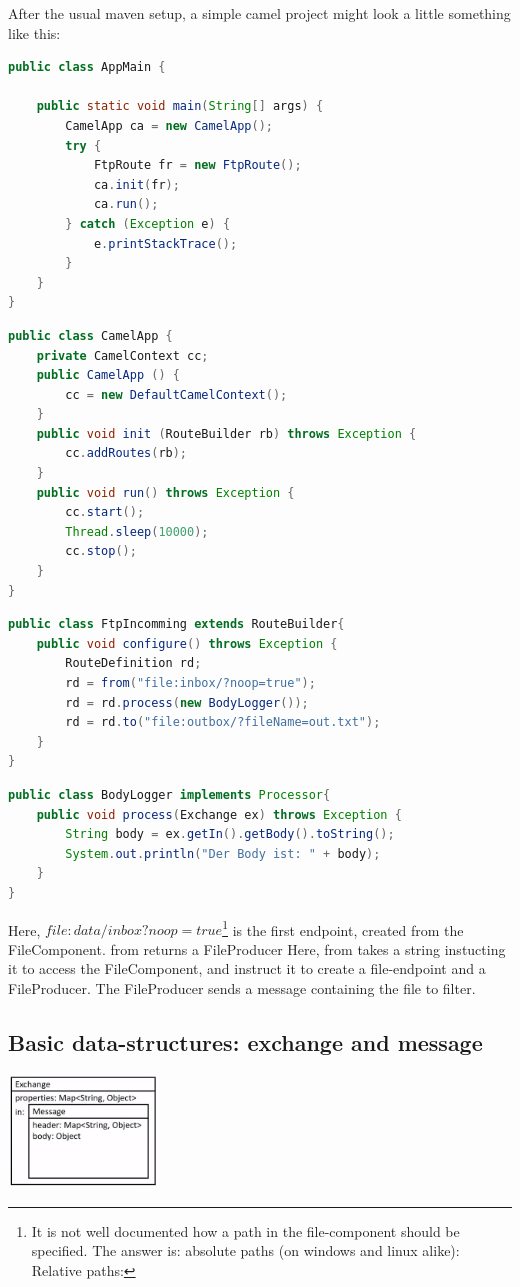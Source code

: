 After the usual maven setup, a simple camel project might look a little something like this: 

\begin{lstlisting}[language=java]
public class AppMain {

	public static void main(String[] args) {
		CamelApp ca = new CamelApp();
		try {
			FtpRoute fr = new FtpRoute();
			ca.init(fr);
			ca.run();
		} catch (Exception e) {
			e.printStackTrace();
		}
	}
}
\end{lstlisting}

\begin{lstlisting}[language=java]
public class CamelApp {
	private CamelContext cc;
	public CamelApp () {
		cc = new DefaultCamelContext();
	}
	public void init (RouteBuilder rb) throws Exception {
		cc.addRoutes(rb);
	}
	public void run() throws Exception {
		cc.start();
        Thread.sleep(10000);
        cc.stop();
	}
}
\end{lstlisting}

\begin{lstlisting}[language=java]
public class FtpIncomming extends RouteBuilder{
	public void configure() throws Exception {
		RouteDefinition rd;
		rd = from("file:inbox/?noop=true");
		rd = rd.process(new BodyLogger());
		rd = rd.to("file:outbox/?fileName=out.txt");
	}
}
\end{lstlisting}
\begin{lstlisting}[language=java]
public class BodyLogger implements Processor{
	public void process(Exchange ex) throws Exception {
		String body = ex.getIn().getBody().toString();
		System.out.println("Der Body ist: " + body);
	}
}
\end{lstlisting}

Here, $file:data/inbox?noop=true$\footnote{ It is not well documented how a path in the file-component should be specified. The answer is: absolute paths (on windows and linux alike): 
Relative paths: 
} is the first endpoint, created from the FileComponent. from returns a FileProducer
Here, from takes a string instucting it to access the FileComponent, and instruct it to create a file-endpoint and a FileProducer. The FileProducer sends a message containing the file to filter.  


\subsection{Basic data-structures: exchange and message}
\includegraphics[width=0.3\textwidth]{images/exchange.png}

